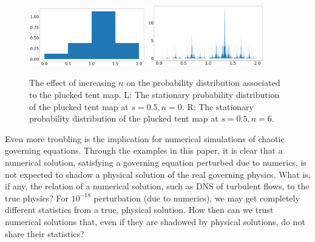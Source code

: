 \begin{figure}
    \centering
    \includegraphics[width=0.45\textwidth]{figure/osc_tent_dens_0.5_0.png}
    \includegraphics[width=0.45\textwidth]{figure/osc_tent_dens_0.5_6.png}
    \caption{The effect of increasing $n$ on the probability distribution associated to the plucked tent map. L: The stationary probability distribution of the plucked tent map at $s=0.5, n = 0$. R: The stationary probability distribution of the plucked tent map at $s=0.5, n = 6$.}
    \label{fig:map}
\end{figure}
Even more troubling is the implication for numerical simulations of chaotic
governing equations.  Through the examples in this paper, it is clear that a numerical solution, satisfying
a governing equation perturbed due to numerics, is not expected to shadow a
physical solution of the real governing physics.  What is, if any, the
relation of a numerical solution, such as DNS of turbulent flows, to
the true physics? For $10^{-18}$ perturbation (due to numerics), 
we may get completely different statistics from a true, physical solution. 
How then can we trust numerical solutions that, even if they are shadowed by
physical solutions, do not share their statistics? 

